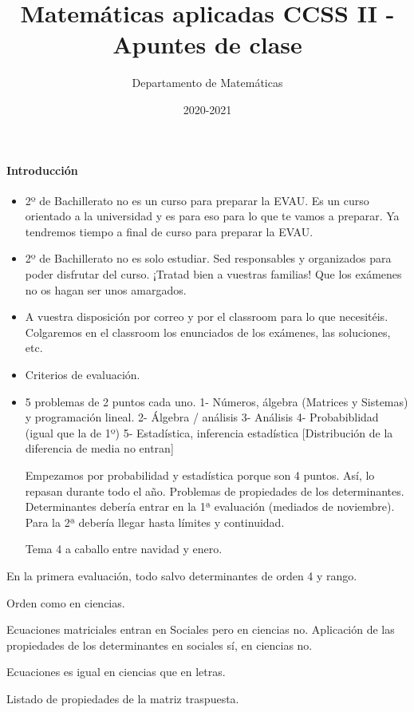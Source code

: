 \documentclass[nobuilddate]{Docencia}
\title{Matemáticas aplicadas CCSS II - Apuntes de clase}
\author{Departamento de Matemáticas}
\date{2020-2021}
\begin{document}
\pagestyle{plain}
\maketitle
\tableofcontents
\newpage

\newcommand{\hide}[1]{#1}

\renewcommand{\vec}[1]{\overrightarrow{#1}}

\paragraph{Introducción}

\begin{itemize}
    \item 2º de Bachillerato no es un curso para preparar la EVAU. Es un curso orientado a la universidad y es para eso para lo que te vamos a preparar. 
    Ya tendremos tiempo a final de curso para preparar la EVAU.
    
    \item 2º de Bachillerato no es solo estudiar. Sed responsables y organizados para poder disfrutar del curso. ¡Tratad bien a vuestras familias! Que los exámenes no os hagan ser unos amargados.
    
    \item A vuestra disposición por correo y por el classroom para lo que necesitéis. Colgaremos en el classroom los enunciados de los exámenes, las soluciones, etc.
    
    \item Criterios de evaluación. 

    \item 

    5 problemas de 2 puntos cada uno.
1-  Números, álgebra (Matrices y Sistemas) y programación lineal.
2-  Álgebra / análisis
3-  Análisis
4-  Probabiblidad (igual que la de 1º)
5-  Estadística, inferencia estadística [Distribución de la diferencia de media no entran]

Empezamos por probabilidad y estadística porque son 4 puntos. Así, lo repasan durante todo el año.
Problemas de propiedades de los determinantes.
Determinantes debería entrar en la 1ª evaluación (mediados de noviembre).
Para la 2ª debería llegar hasta límites y continuidad.

Tema 4 a caballo entre navidad y enero.

\end{itemize}




En la primera evaluación, todo salvo determinantes de orden 4 y rango.

Orden como en ciencias.

Ecuaciones matriciales entran en Sociales pero en ciencias no. Aplicación de las propiedades de los determinantes en sociales sí, en ciencias no.

Ecuaciones es igual en ciencias que en letras.

Listado de propiedades de la matriz traspuesta.


%
%
%

\newpage
\printindex
\listoffigures
\listoftables
\end{document}
